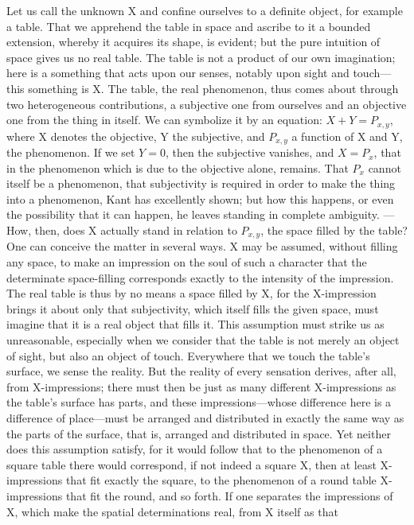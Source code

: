 \documentclass[12pt]{article}
\begin{document}
Let us call the unknown X and confine ourselves to a definite object,
for example a table. That we apprehend the table in space and ascribe to
it a bounded extension, whereby it acquires its shape, is evident; but the
pure intuition of space gives
us no real table. The table is not a product of our own imagination; here
is a something that acts upon our senses, notably upon sight and touch—this
something is X. The table, the real phenomenon, thus comes about through
two heterogeneous contributions, a subjective one from ourselves and an
objective one from the thing in itself. We can symbolize it by an equation:
$X + Y = P_{x,y}$, where X denotes the objective, Y the subjective, and
$P_{x,y}$ a function of X and Y, the phenomenon. If we set $Y = 0$, then
the subjective vanishes, and $X = P_x$, that in the phenomenon which is due
to the objective alone, remains. That $P_x$ cannot itself be a phenomenon,
that subjectivity is required in order to make the thing into a phenomenon,
Kant has excellently shown; but how this happens, or even the possibility
that it can happen, he leaves standing in complete ambiguity. --- How,
then, does X actually stand in relation to $P_{x,y}$, the space filled by
the table? One can conceive the matter in several ways. X may be assumed,
without filling any space, to make an impression on the soul of such a
character that the determinate space-filling corresponds exactly to the
intensity of the impression. The real table is thus by no means a space
filled by X, for the X-impression brings it about only that subjectivity,
which itself fills the given space, must imagine that it is a real object
that fills it. This assumption must strike us as unreasonable, especially
when we consider that the table is not merely an object of sight, but also
an object of touch. Everywhere that we touch the table's surface, we sense
the reality. But the reality of every sensation derives, after all, from
X-impressions; there must then be just as many different X-impressions as
the table's surface has parts, and these impressions—whose difference here
is a difference of place—must be arranged and distributed in exactly the
same way as the parts of the surface, that is, arranged and distributed in
space. Yet neither does this assumption satisfy, for it would follow that
to the phenomenon of a square table there would correspond, if not indeed
a square X, then at least X-impressions that fit exactly the square, to the
phenomenon of a round table X-impressions that fit the round, and so forth.
If one separates the impressions
of X, which make the spatial determinations real, from X itself as that
\end{document}

